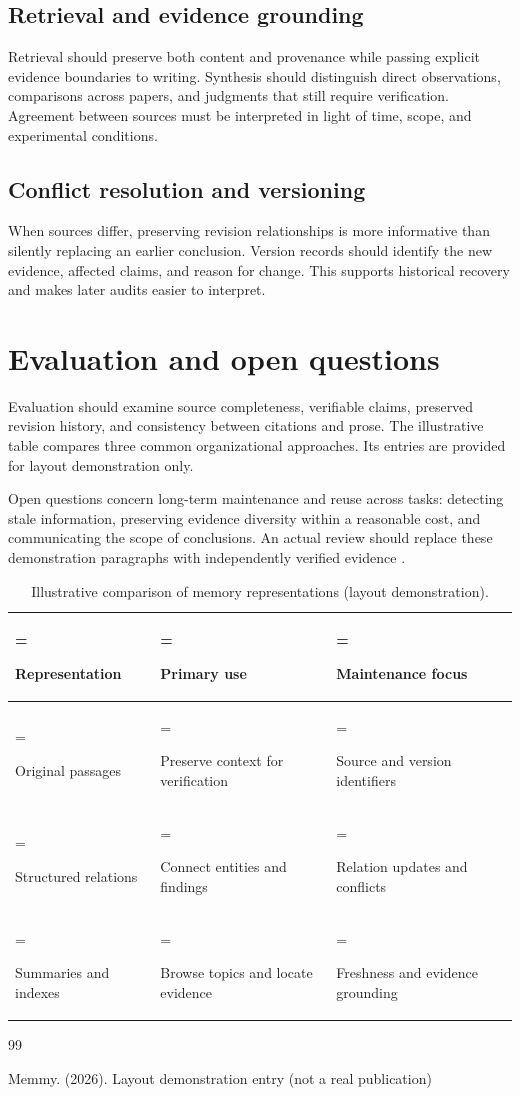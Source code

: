 \documentclass[11pt]{article}
\begin{document}
\subsection{Retrieval and evidence grounding}

Retrieval should preserve both content and provenance while passing explicit evidence boundaries to writing. Synthesis should distinguish direct observations, comparisons across papers, and judgments that still require verification. Agreement between sources must be interpreted in light of time, scope, and experimental conditions.

\subsection{Conflict resolution and versioning}

When sources differ, preserving revision relationships is more informative than silently replacing an earlier conclusion. Version records should identify the new evidence, affected claims, and reason for change. This supports historical recovery and makes later audits easier to interpret.

\section{Evaluation and open questions}

Evaluation should examine source completeness, verifiable claims, preserved revision history, and consistency between citations and prose. The illustrative table compares three common organizational approaches. Its entries are provided for layout demonstration only.

Open questions concern long-term maintenance and reuse across tasks: detecting stale information, preserving evidence diversity within a reasonable cost, and communicating the scope of conclusions. An actual review should replace these demonstration paragraphs with independently verified evidence \cite{LayoutDemo2026}.

\begin{table}[H]
\centering
\small
\caption{Illustrative comparison of memory representations (layout demonstration).}
\label{tab:comparison-block}
\begin{tabularx}{\linewidth}{>{\hsize=0.633\hsize\linewidth=\hsize\raggedright\arraybackslash}X >{\hsize=1.267\hsize\linewidth=\hsize\raggedright\arraybackslash}X >{\hsize=1.100\hsize\linewidth=\hsize\raggedright\arraybackslash}X}
\toprule
\rowcolor{MemmyTint} \textbf{Representation} & \textbf{Primary use} & \textbf{Maintenance focus} \\
\midrule
Original passages & Preserve context for verification & Source and version identifiers \\
Structured relations & Connect entities and findings & Relation updates and conflicts \\
Summaries and indexes & Browse topics and locate evidence & Freshness and evidence grounding \\
\bottomrule
\end{tabularx}
\end{table}

\begin{thebibliography}{99}
\small
\raggedright
\setlength{\itemsep}{0.18em}
\setlength{\parsep}{0pt}
 Memmy. (2026). Layout demonstration entry (not a real publication)
\end{thebibliography}
\end{document}
